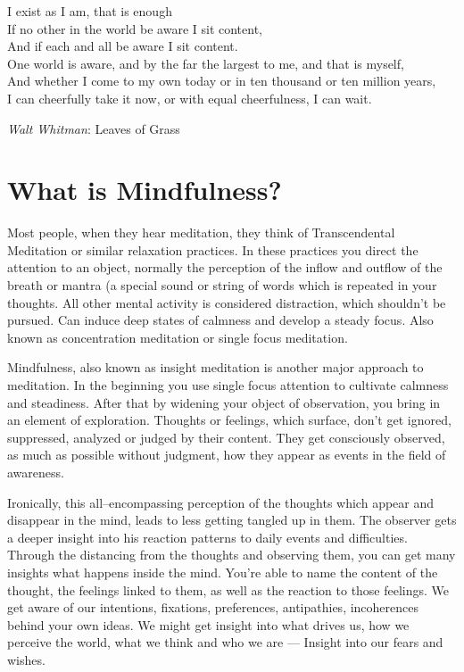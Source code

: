 \documentclass[../Book.Stress_regulation.tex]{subfiles}
\begin{document}
\setlength{}

 \epigraph{I exist as I am, that is enough \\
If no other in the world be aware I sit content,\\
And if each and all be aware I sit content.\\
One world is aware, and by the far the largest to me, and that is myself,\\
And whether I come to my own today or in ten thousand or ten million years,\\
I can cheerfully take it now, or with equal cheerfulness, I can wait.}{\textit{Walt Whitman}: Leaves of Grass}
\setlength{}
\section{What is Mindfulness?}

Most people, when they hear meditation, they think of {Transcendental Meditation\texttrademark} or similar relaxation practices.
In these practices you  {direct the attention to an object}, normally the perception of the inflow and outflow of the {breath or mantra} (a special sound or string of words which is repeated in your thoughts.
All other mental activity is considered {distraction}, which shouldn't be pursued.
Can induce deep states of {calmness} and {develop a steady focus}.
Also known as concentration meditation or {single focus meditation}.   

Mindfulness, also known as {insight meditation} is another major approach to meditation.
In the beginning you use single focus attention to cultivate calmness and steadiness.
After that by {widening your object of observation}, you bring in an element of exploration.
{Thoughts or feelings}, which surface, don't get ignored, suppressed, analyzed or judged by their content.
They get consciously {observed}, as much as possible {without judgment}, how they appear as events in the field of awareness.



Ironically, this all--encompassing perception of the thoughts which appear and disappear in the mind, leads to {less getting tangled up} in them.
The observer gets a {deeper insight} into his reaction patterns to daily events and difficulties.
Through the distancing from the thoughts and observing them, you can get many insights what happens {inside the mind}.
You're able to {name the content} of the thought, the feelings linked to them, as well as the reaction to those feelings.
We get aware of our intentions, fixations, preferences, antipathies, incoherences behind your own ideas. We might get insight into what drives us, how we perceive the world, what we think and who we are ---
Insight into our fears and wishes.
\end{document}
